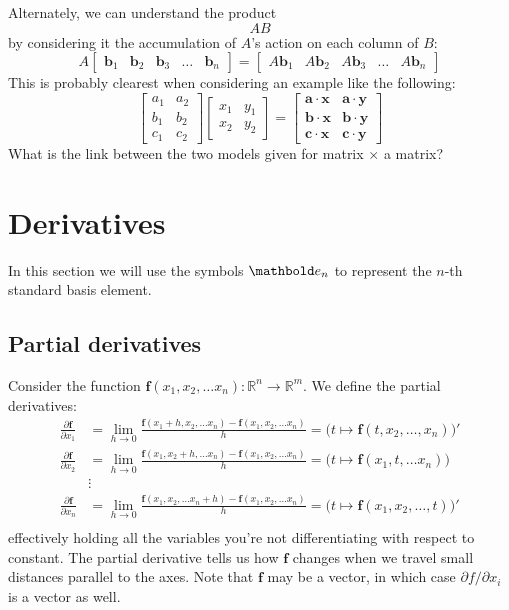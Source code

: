 \documentclass{scrartcl}
\providecommand{\R}{\mathbb{R}}
\renewcommand{\vec}{\mathbold}
\newcommand{\f}{\vec f}
\begin{document}
Alternately, we can understand the product
\[
  AB
\]
by considering it the accumulation of $A$'s action on each column of $B$:
\[
  A
  \begin{bmatrix}
    \vec b_1 & \vec b_2 & \vec b_3 &\dots& \vec b_n
  \end{bmatrix}
  =
  \begin{bmatrix}
    A\vec b_1 & A\vec b_2 & A\vec b_3 &\dots& A\vec b_n
  \end{bmatrix}
\]
This is probably clearest when considering an example like the following:
\[
  \begin{bmatrix}
    a_1 & a_2 \\
    b_1 & b_2 \\
    c_1 & c_2
  \end{bmatrix}
  \begin{bmatrix}
    x_1 & y_1 \\ x_2 & y_2
  \end{bmatrix}
  =
  \begin{bmatrix}
   \vec a \cdot \vec x & \vec a \cdot \vec y\\
   \vec b \cdot \vec x & \vec b \cdot \vec y \\
   \vec c \cdot \vec x & \vec c \cdot \vec y
  \end{bmatrix}
\]
What is the link between the two models given for matrix $\times$ a matrix?
\section{Derivatives}
In this section we will use the symbols $\basis_n$ to represent the $n$-th standard basis element.
\subsection{Partial derivatives}
Consider the function $\f(x_1,x_2,\dots x_n):\R^n\to\R^m$. We define the partial derivatives:
\begin{align*}
  \frac{\partial \f}{\partial x_1}&=\lim_{h\to 0}\frac{\f(x_1+h,x_2,\dots x_n)-\f(x_1,x_2,\dots x_n)}{h} =\big(t\mapsto \f(t,x_2,\dots,x_n)\big)' \\
  \frac{\partial \f}{\partial x_2}&=\lim_{h\to 0}\frac{\f(x_1,x_2+h,\dots x_n)-\f(x_1,x_2,\dots x_n)}{h} =\big(t\mapsto \f(x_1,t,\dots x_n )\big)\\
  &\vdots \\
  \frac{\partial \f}{\partial x_n}&=\lim_{h\to 0}\frac{\f(x_1,x_2,\dots x_n+h)-\f(x_1,x_2,\dots x_n)}{h}=\big(t\mapsto \f(x_1,x_2,\dots,t)\big)' \\
\end{align*}
effectively holding all the variables you're not differentiating with respect to
constant. The partial derivative tells us how $\f$ changes when we travel small
distances parallel to the axes. Note that $\f$ may be a vector, in which case
$\partial f/\partial x_i$ is a vector as well.
\end{document}
